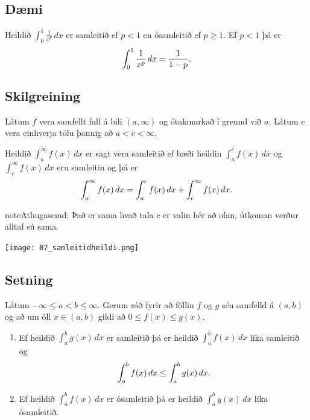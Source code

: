 \documentclass[a4paper,10pt,icelandic]{sphinxmanual}
\begin{document}
\subsection{Dæmi}
\label{kafli06:id9}
Heildið \(\int_0^1 \frac{1}{x^p}\,dx\) er samleitið ef \(p<1\)
en ósamleitið ef \(p\geq 1\). Ef \(p<1\) þá er
\begin{gather}
\begin{split}\int_0^1
\frac{1}{x^p}\,dx=\frac{1}{1-p}.\end{split}\notag
\end{gather}

\subsection{Skilgreining}
\label{kafli06:id10}
Látum \(f\) vera samfellt fall á bili \((a,\infty)\) og
ótakmarkað í grennd við \(a\). Látum \(c\) vera einhverja tölu
þannig að \(a<c<\infty\).

Heildið \(\int_a^\infty f(x)\,dx\) er sagt vera samleitið ef bæði
heildin \(\int_a^c f(x)\,dx\) og \(\int_c^\infty f(x)\,dx\) eru
samleitin og þá er
\begin{gather}
\begin{split}\int_{a}^\infty f(x)\,dx=\int_{a}^c f(x)\,dx + \int_c^\infty f(x)\,dx.\end{split}\notag
\end{gather}
\begin{notice}{note}{Athugasemd:}
Það er sama hvað tala \(c\) er valin hér að ofan, útkoman verður
alltaf sú sama.
\end{notice}


\begin{center}
\texttt{[image: 07\_samleitidheildi.png]}
\end{center}



\subsection{Setning}
\label{kafli06:id11}
Látum \(-\infty\leq a<b\leq \infty\). Gerum ráð fyrir að föllin
\(f\) og \(g\) séu samfelld á \((a, b)\) og að um öll
\(x\in (a, b)\) gildi að \(0\leq f(x)\leq g(x)\).
\begin{enumerate}
\item {} 
Ef heildið \(\int_a^b g(x)\,dx\) er samleitið þá er heildið
\(\int_a^b f(x)\,dx\) líka samleitið og
\begin{gather}
\begin{split}\int_a^b f(x)\,dx \leq \int_a^b g(x)\,dx.\end{split}\notag
\end{gather}
\item {} 
Ef heildið \(\int_a^b f(x)\,dx\) er ósamleitið þá er heildið
\(\int_a^b g(x)\,dx\) líka ósamleitið.

\end{enumerate}
\end{document}
